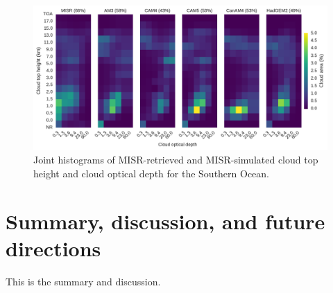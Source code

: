 \begin{figure}
\centering
\includegraphics[width=\columnwidth]{graphics/cmip5_clMISR_SouthernOcean.pdf}
\caption{Joint histograms of MISR-retrieved and MISR-simulated cloud top height and cloud optical depth for the Southern Ocean.}
\label{cmip5_clMISR_SouthernOcean}
\end{figure}

\section{Summary, discussion, and future directions}
This is the summary and discussion.
